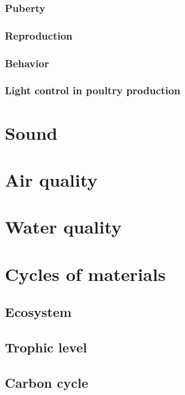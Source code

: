 \documentclass[]{book}
\begin{document}
\subsection{Puberty}\label{puberty}

\subsection{Reproduction}\label{reproduction}

\subsection{Behavior}\label{behavior}

\subsection{Light control in poultry
production}\label{light-control-in-poultry-production}

\chapter{Sound}\label{sound}

\chapter{Air quality}\label{air-quality}

\chapter{Water quality}\label{water-quality}

\chapter{Cycles of materials}\label{cycles-of-materials}

\section{Ecosystem}\label{ecosystem}

\section{Trophic level}\label{trophic-level}

\section{Carbon cycle}\label{carbon-cycle}
\end{document}
